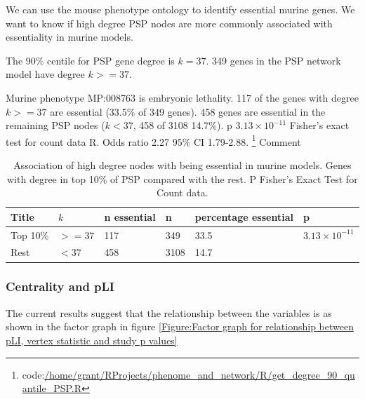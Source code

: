  We can use the mouse phenotype ontology to identify essential murine genes. 
 We want to know if high degree PSP nodes are more commonly associated with essentiality in murine models. 
 
 The 90\% centile for PSP gene degree is $k=37$. 349 genes in the PSP network model have degree $k>=37$.
 
 Murine phenotype MP:008763 is embryonic lethality. 117 of the genes with degree $k>=37$ are essential (33.5\% of 349 genes). 458 genes are essential in the remaining PSP nodes ($k < 37$, 458 of 3108 14.7\%). p $3.13 \times 10^{-11}$ Fisher's exact test for count data R. Odds ratio 2.27 95\% CI 1.79-2.88. \footnote{code:\url{/home/grant/RProjects/phenome_and_network/R/get_degree_90_quantile_PSP.R}}  Comment 
 
 \begin{table}[h]
     \centering
     \begin{tabular}{llllll}
          Title & $k$& n essential & n & percentage essential & p   \\
          \hline
          Top 10\% & $>=37$ & 117 & 349 & 33.5 & $3.13 \times 10^{-11}$\\
          Rest & $<37$ & 458 & 3108 & 14.7 & \\
     \end{tabular}
     \caption{Association of high degree nodes with being essential in murine models. Genes with degree in top 10\% of PSP compared with the rest. P Fisher's Exact Test for Count data.}
     \label{Table:Degree and murine essentialness PSP}
 \end{table}
 



\subsubsection{Centrality and pLI}
The current results suggest that the relationship between the variables is as shown in the factor graph in figure \ref{Figure:Factor graph for relationship between pLI, vertex statistic and study p values}

